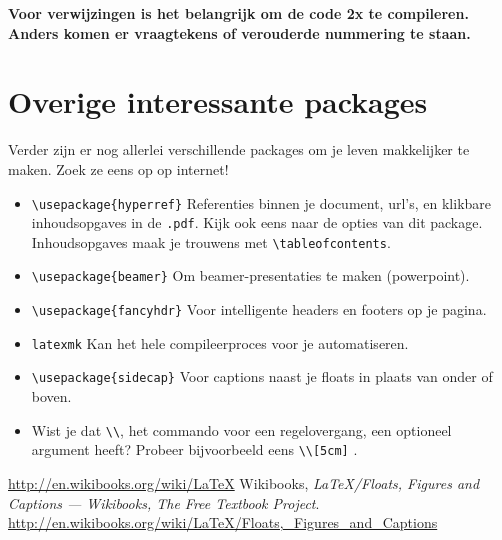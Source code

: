 \textbf{Voor verwijzingen is het belangrijk om de code 2x te compileren. Anders
komen er vraagtekens of verouderde nummering te staan.}

\section{Overige interessante packages}
Verder zijn er nog allerlei verschillende packages om je leven makkelijker te maken. Zoek ze eens op op internet!
\begin{itemize}
	\item \verb&\usepackage{hyperref}& Referenties binnen je document, url's, en klikbare inhoudsopgaves in de \verb+.pdf+. Kijk ook eens naar de opties van dit package. Inhoudsopgaves maak je trouwens met \verb&\tableofcontents&.
	\item \verb&\usepackage{beamer}& Om beamer-presentaties te maken (powerpoint).
	\item \verb&\usepackage{fancyhdr}& Voor intelligente headers en footers op je pagina.
	\item \texttt{latexmk} Kan het hele compileerproces voor je automatiseren.
	\item \verb&\usepackage{sidecap}& Voor captions naast je floats in plaats van onder of boven.
	\item Wist je dat \verb&\\&, het commando voor een regelovergang, een optioneel argument heeft? Probeer bijvoorbeeld eens \verb&\\[5cm]& .
\end{itemize}

\begin{thebibliography}{99}
		\url{http://en.wikibooks.org/wiki/LaTeX}
	 Wikibooks, \emph{LaTeX/Floats, Figures and Captions
		--- Wikibooks{,} The Free Textbook Project}.
		\url{http://en.wikibooks.org/wiki/LaTeX/Floats,_Figures_and_Captions}
\end{thebibliography}



